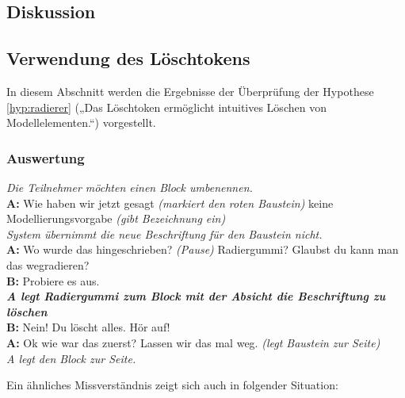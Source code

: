 \subsection{Diskussion} %


\subsection{Verwendung des Löschtokens} %
\label{sub:verwendung_des_löschtokens}

In diesem Abschnitt werden die Ergebnisse der Überprüfung der Hypothese \ref{hyp:radierer} („Das Löschtoken ermöglicht intuitives Löschen von Modellelementen.“) vorgestellt.

\subsubsection{Auswertung} %

\begin{transkript}
	\emph{Die Teilnehmer möchten einen Block umbenennen.}\\
	\textbf{A:} Wie haben wir jetzt gesagt \emph{(markiert den roten Baustein)} keine Modellierungsvorgabe \emph{(gibt Bezeichnung ein)}\\
	\emph{System übernimmt die neue Beschriftung für den Baustein nicht.}\\
	\textbf{A:} Wo wurde das hingeschrieben? \emph{(Pause)} Radiergummi? Glaubst du kann man das wegradieren?\\
	\textbf{B:} Probiere es aus.\\
	\textbf{\emph{A legt Radiergummi zum Block mit der Absicht die Beschriftung zu löschen}}\\
	\textbf{B:} Nein! Du löscht alles. Hör auf! \\
	\textbf{A:} Ok wie war das zuerst? Lassen wir das mal weg. \emph{(legt Baustein zur Seite)}\\
	\emph{A legt den Block zur Seite.} 
\end{transkript}

Ein ähnliches Missverständnis zeigt sich auch in folgender Situation:

